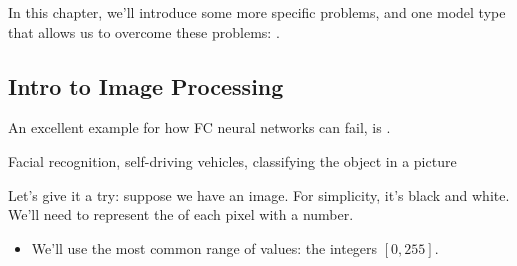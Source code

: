         In this chapter, we'll introduce some more specific problems, and one model type that allows us to overcome these problems: .

        \pagebreak

    \subsection{Intro to Image Processing}

        An excellent example for how FC neural networks can fail, is .

        \miniex Facial recognition, self-driving vehicles, classifying the object in a picture

        Let's give it a try: suppose we have an image. For simplicity, it's black and white. We'll need to represent the  of each pixel with a number.

        \begin{itemize}
            \item We'll use the most common range of values: the integers $[0,255]$.
        \end{itemize}


